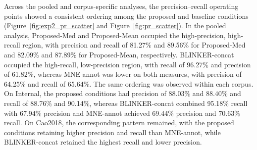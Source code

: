 Across the pooled and corpus-specific analyses, the precision--recall operating points showed a consistent ordering among the proposed and baseline conditions (Figure~\ref{fig:exp2_pr_scatter} and Figure~\ref{fig:pr_scatter}). In the pooled analysis, Proposed-Med and Proposed-Mean occupied the high-precision, high-recall region, with precision and recall of 81.27\% and 89.56\% for Proposed-Med and 82.09\% and 87.89\% for Proposed-Mean, respectively. BLINKER-concat occupied the high-recall, low-precision region, with recall of 96.27\% and precision of 61.82\%, whereas MNE-annot was lower on both measures, with precision of 64.25\% and recall of 65.64\%. The same ordering was observed within each corpus. On Internal, the proposed conditions had precision of 88.03\% and 88.40\% and recall of 88.76\% and 90.14\%, whereas BLINKER-concat combined 95.18\% recall with 67.94\% precision and MNE-annot achieved 69.44\% precision and 70.63\% recall. On Cao2018, the corresponding pattern remained, with the proposed conditions retaining higher precision and recall than MNE-annot, while BLINKER-concat retained the highest recall and lower precision.

